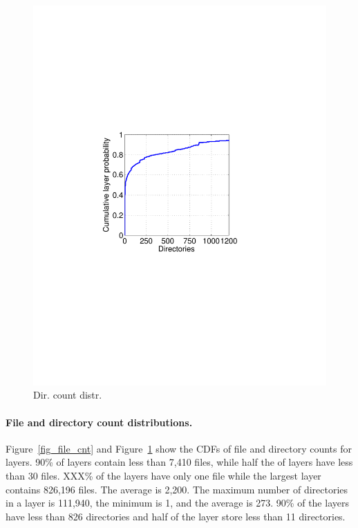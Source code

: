 \begin{figure}
\begin{minipage}{0.23\textwidth}
		\includegraphics[width=1\textwidth]{graphs/dir_cnt.pdf}
		\caption{Dir. count distr.
		}
		\label{fig_dir_cnt}
	\end{minipage}%
\end{figure}
%

\paragraph{File and directory count distributions.}

Figure~\ref{fig_file_cnt} and Figure~\ref{fig_dir_cnt} show the CDFs of file
and directory counts for layers.
%
90\% of layers contain less than 7,410 files, while half the of layers have
less than 30 files.
%
XXX\% of the layers have only one file while the largest layer contains 826,196
files.
%
The average is 2,200.
%
The maximum number of directories in a layer is 111,940, the minimum is 1, and
the average is 273.
%
90\% of the layers have less than 826 directories and half of the layer store
less than 11 directories.
%

